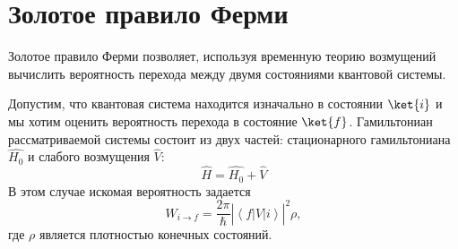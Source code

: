 \section{Золотое правило Ферми}
Золотое правило Ферми позволяет, используя временную теорию возмущений
вычислить вероятность перехода между двумя состояниями квантовой
системы.

\begin{theorem}
  \label{addQuantGoldenRuleFermi}
  Допустим, что квантовая система находится изначально в состоянии
  $\ket{i}$ и мы хотим оценить вероятность перехода в состояние 
  $\ket{f}$. Гамильтониан рассматриваемой системы состоит из
  двух частей: стационарного гамильтониана $\hat{H_0}$ и слабого
  возмущения $\hat{V}$:
  \begin{equation}
    \hat{H} = \hat{H_0} + \hat{V}
    \nonumber
  \end{equation}
  В этом случае искомая вероятность задается
  \begin{equation}
    W_{i \rightarrow f} = \frac{2 \pi}{\hbar}
    \left|
    \left<
    f
    \right|
    \hat{V}
    \left|
    i
    \right>
    \right|^2 \rho
    \nonumber,
  \end{equation}
  где $\rho$ является плотностью конечных состояний.
\end{theorem}

